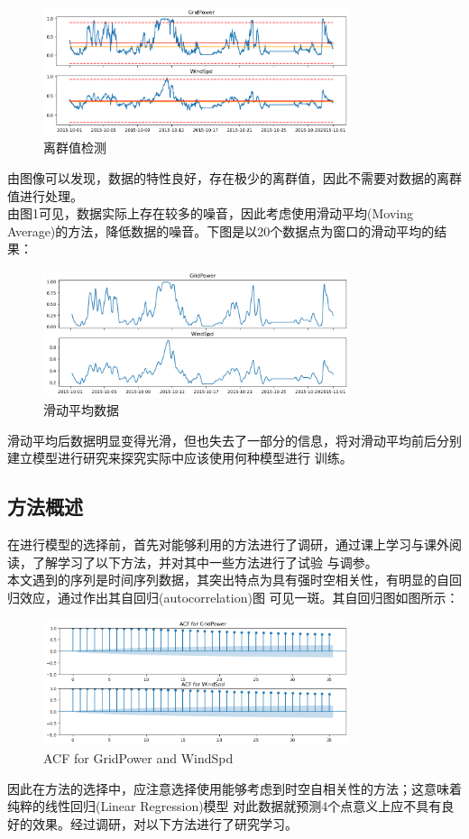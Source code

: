 \documentclass{ctexart}
\begin{document}
\begin{figure}[htbp]
    \centering
    \includegraphics[width=0.80\textwidth]{photos/outliers.png}
    \caption{离群值检测}
\end{figure}
由图像可以发现，数据的特性良好，存在极少的离群值，因此不需要对数据的离群值进行处理。\\
\indent 由图1可见，数据实际上存在较多的噪音，因此考虑使用滑动平均(Moving Average)的方法，降低数据的噪音。下图是以20个数据点为窗口的滑动平均的结果：\\
\begin{figure}[htbp]
    \centering
    \includegraphics[width = 0.8\textwidth]{photos/ma_time_series.png}
    \caption{滑动平均数据}
\end{figure}
滑动平均后数据明显变得光滑，但也失去了一部分的信息，将对滑动平均前后分别建立模型进行研究来探究实际中应该使用何种模型进行
训练。\\

\subsection{方法概述}
在进行模型的选择前，首先对能够利用的方法进行了调研，通过课上学习与课外阅读，了解学习了以下方法，并对其中一些方法进行了试验
与调参。\\
\indent 本文遇到的序列是时间序列数据，其突出特点为具有强时空相关性，有明显的自回归效应，通过作出其自回归(autocorrelation)图
可见一斑。其自回归图如图所示：\\
\begin{figure}[htbp]
    \centering
    \includegraphics[width=0.8\textwidth]{photos/acf.png}
    \caption{ACF for GridPower and WindSpd}
\end{figure}
\indent 因此在方法的选择中，应注意选择使用能够考虑到时空自相关性的方法；这意味着纯粹的线性回归(Linear Regression)模型
对此数据就预测4个点意义上应不具有良好的效果。经过调研，对以下方法进行了研究学习。
\end{document}

